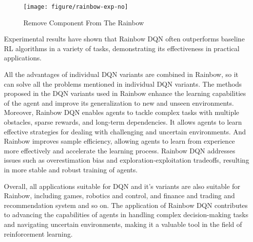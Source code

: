 \documentclass{article}
\begin{document}
     
\begin{figure}[htbp]
        \centering
        \texttt{[image: figure/rainbow-exp-no]}
        \caption{Remove Component From The Rainbow}
     \end{figure}
     
Experimental results have shown that Rainbow DQN often outperforms baseline RL algorithms in a variety of tasks, demonstrating its effectiveness in practical applications.

All the advantages of individual DQN variants are combined in Rainbow, so it can solve all the problems mentioned in individual DQN variants. The methods proposed in the DQN variants used in Rainbow enhance the learning capabilities of the agent and improve its generalization to new and unseen environments. Moreover, Rainbow DQN enables agents to tackle complex tasks with multiple obstacles, sparse rewards, and long-term dependencies. It allows agents to learn effective strategies for dealing with challenging and uncertain environments. And Rainbow improves sample efficiency, allowing agents to learn from experience more effectively and accelerate the learning process. Rainbow DQN addresses issues such as overestimation bias and exploration-exploitation tradeoffs, resulting in more stable and robust training of agents.

Overall, all applications suitable for DQN and it's variants are also suitable for Rainbow, including games, robotics and control, and finance and trading and recommendation system and so on. The application of Rainbow DQN contributes to advancing the capabilities of agents in handling complex decision-making tasks and navigating uncertain environments, making it a valuable tool in the field of reinforcement learning.
\end{document}
